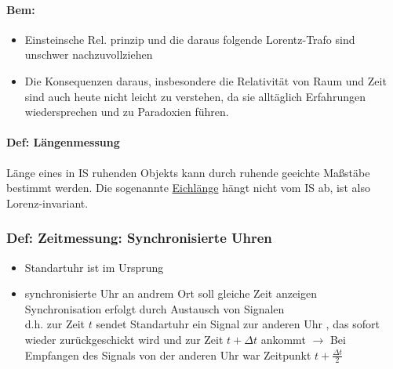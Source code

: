 \documentclass[titlepage,12pt,a4paper,ngerman]{report}
\begin{document}
{\paragraph{Bem:}
\begin{itemize}
	\item Einsteinsche Rel. prinzip und die daraus folgende Lorentz-Trafo sind unschwer nachzuvollziehen
	\item Die Konsequenzen daraus, insbesondere die Relativität von Raum und Zeit sind auch heute nicht leicht zu verstehen, da sie alltäglich Erfahrungen wiedersprechen und zu Paradoxien führen.
\end{itemize}

\paragraph{Def: Längenmessung}
Länge eines in IS ruhenden Objekts kann durch ruhende geeichte Maßstäbe bestimmt werden. Die sogenannte \underline{Eichlänge} hängt nicht vom IS ab, ist also Lorenz-invariant.

\subsubsection{Def: Zeitmessung: Synchronisierte Uhren}


\begin{itemize}
	\item Standartuhr ist im Ursprung
	\item synchronisierte Uhr an andrem Ort soll gleiche Zeit anzeigen\\
	Synchronisation erfolgt durch Austausch von Signalen\\
	d.h. zur Zeit $ t $ sendet Standartuhr ein Signal zur anderen Uhr , das sofort wieder zurückgeschickt wird und zur Zeit $ t+\Delta t $ ankommt $ \rightarrow $ Bei Empfangen des Signals von der anderen Uhr war Zeitpunkt $ t + \frac{\Delta t}{2} $
\end{itemize}

}
\end{document}
